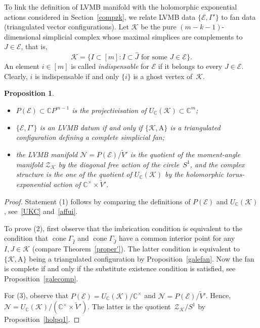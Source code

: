 \documentclass[a4paper]{amsart}
\newtheorem{proposition}[theorem]{Proposition}
\theoremstyle{definition}
\theoremstyle{remark}
\numberwithin{equation}{section}
\def\C{\mathbb C}
\def\sK{\mathcal K}
\def\cone{\mathop{\mathrm{cone}}}
\newcommand{\zk}{\mathcal Z_{\mathcal K}}
\newcommand{\<}{\langle}
\renewcommand{\>}{\rangle}
\begin{document}
To link the definition of LVMB manifold with the holomorphic exponential actions considered in Section~\ref{compzk}, we relate LVMB data $\{\mathcal E,\Gamma'\}$ to fan data (triangulated vector configurations). Let $\sK$ be the pure $(m-k-1)$-dimensional simplicial complex whose maximal simplices are complements to $J\in\mathcal E$, that is,
\begin{equation}\label{sclvmb}
  \sK=\{I\subset [m]\colon I\subset\widehat J\text{ for some }J\in\mathcal E\}.
\end{equation}
An element $i\in[m]$ is called \emph{indispensable} for $\mathcal E$ if it belongs to every $J\in\mathcal E$. Clearly, $i$ is indispensable if and only $\{i\}$ is a ghost vertex of~$\sK$.

\begin{proposition}\label{LVMBfan}\
\begin{itemize}
\item[(1)] $P(\mathcal E)\subset\C P^{m-1}$ is the projectivisation of $U_\C(\sK)\subset\C^m$;

\item[(2)] $\{\mathcal E,\Gamma'\}$ is an LVMB datum if and only if 
$\{\mathcal K,\mathrm A\}$ is a triangulated configuration defining a complete simplicial fan;

\item[(3)] the LVMB manifold $\mathcal N=P(\mathcal E)/\widetilde V'$ is the quotient of the moment-angle manifold $\zk$ by the diagonal free action of the circle~$S^1$, and the complex structure is the one of the quotient of $U_\C(\sK)$ by the holomorphic torus-exponential action of $\C^\times\times\widetilde V'$.
\end{itemize}
\end{proposition}
\begin{proof}
Statement (1) follows by comparing the definitions of $P(\mathcal E)$ and $U_\C(\sK)$, see~\eqref{UKC} and~\eqref{affui}.

To prove (2), first observe that the imbrication condition is equivalent to the condition that $\cone\Gamma_{\widehat I}$ and $\cone\Gamma_{\widehat J}$ have a common interior point for any $I,J\in\sK$ (compare Theorem~\ref{proper'}). The latter condition is equivalent to 
$\{\mathcal K,\mathrm A\}$ being a triangulated configuration by Proposition~\ref{galefan}. Now the fan is complete if and only if the substitute existence condition is satisfied, see Proposition~\ref{galecomp}.

For (3), observe that $P(\mathcal E)=U_\C(\sK)/\C^\times$ and $\mathcal N=P(\mathcal E)/\widetilde V'$. Hence, $\mathcal N=U_\C(\sK)/(\C^\times\times\widetilde V')$. The latter is the quotient~$\zk/S^1$ by Proposition~\ref{holpq1}.
\end{proof}
\end{document}
